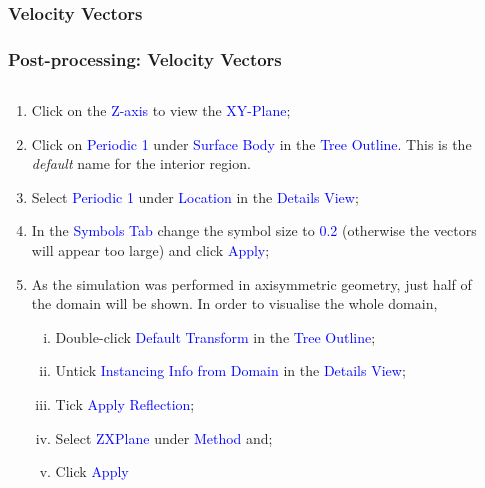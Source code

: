 \documentclass[10pt,compress, unknownkeysallowed]{beamer}
\newcommand{\blue}{\textcolor{blue}}
\begin{document}
\subsubsection{Velocity Vectors}

\begin{frame}
  \frametitle{Post-processing: Velocity Vectors}
    \begin{columns}
        \begin{column}[l]{0.5\linewidth}
           \begin{enumerate}\scriptsize%
                \item<1-> Click on the \blue{Z-axis} to view the \blue{XY-Plane};
                \item<1-> Click on \blue{Periodic 1} under \blue{Surface Body} in the \blue{Tree Outline}. This is the {\it default} name for the interior region. %
                \item<1-> Select \blue{Periodic 1} under \blue{Location} in the \blue{Details View};
                \item<1-> In the \blue{Symbols Tab} change the symbol size to \blue{0.2} (otherwise the vectors will appear too large) and click \blue{Apply};
                \item<2-> As the simulation was performed in axisymmetric geometry, just half of the domain will be shown. In order to visualise the whole domain,   
                    \begin{enumerate}[i)]\scriptsize
                       \item<2-> Double-click \blue{Default Transform} in the \blue{Tree Outline};
                       \item<2-> Untick \blue{Instancing Info from Domain} in the \blue{Details View};
                       \item<2-> Tick \blue{Apply Reflection};
                       \item<2-> Select \blue{ZXPlane} under \blue{Method} and;
                       \item<2-> Click \blue{Apply}
                    \end{enumerate}    
           \end{enumerate}
        \end{column}
        \begin{column}[l]{0.5\linewidth}

\end{column}
\end{columns}
\end{frame}
\end{document}
